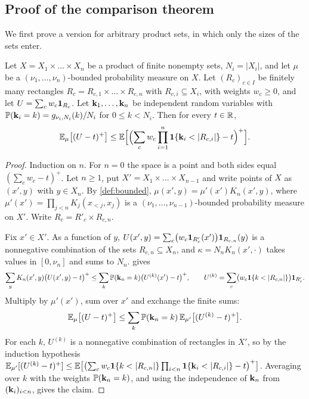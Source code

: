\subsection{Proof of the comparison theorem}\label{sec:proof}

We first prove a version for arbitrary product sets, in which only the sizes of the sets enter.

\begin{proposition}\label{prop:rectangles}
Let $X=X_1\times\dots\times X_n$ be a product of finite nonempty sets, $N_i=|X_i|$, and let $\mu$ be a
$(\nu_1,\dots,\nu_n)$-bounded probability measure on $X$. Let $(R_c)_{c\in I}$ be finitely many rectangles
$R_c=R_{c,1}\times\dots\times R_{c,n}$ with $R_{c,i}\subseteq X_i$, with weights $w_c\ge0$, and let
$U=\sum_cw_c\mathbf{1}_{R_c}$. Let $\mathbf{k}_1,\dots,\mathbf{k}_n$ be independent random variables with
$\mathbb{P}(\mathbf{k}_i=k)=g_{\nu_i,N_i}(k)/N_i$ for $0\le k<N_i$. Then for every $t\in\mathbb{R}$,
\[
  \E_\mu\bigl[(U-t)^+\bigr]\le\E\Bigl[\Bigl(\sum_cw_c\prod_{i=1}^n\one\{\bk_i<|R_{c,i}|\}-t\Bigr)^+\Bigr].
\]
\end{proposition}

\begin{proof}
Induction on $n$. For $n=0$ the space is a point and both sides equal $(\sum_cw_c-t)^+$. Let $n\ge1$, put
$X'=X_1\times\dots\times X_{n-1}$ and write points of $X$ as $(x',y)$ with $y\in X_n$. By
\cref{def:bounded}, $\mu(x',y)=\mu'(x')K_n(x',y)$, where $\mu'(x')=\prod_{j<n}K_j(x_{<j},x_j)$ is a
$(\nu_1,\dots,\nu_{n-1})$-bounded probability measure on $X'$. Write $R_c=R'_c\times R_{c,n}$.

Fix $x'\in X'$. As a function of $y$,
$U(x',y)=\sum_c\bigl(w_c\mathbf{1}_{R'_c}(x')\bigr)\mathbf{1}_{R_{c,n}}(y)$ is a nonnegative combination of the sets
$R_{c,n}\subseteq X_n$, and $\kappa=N_nK_n(x',\cdot)$ takes values in $[0,\nu_n]$ and sums to $N_n$.
 gives
\[
  \sum_yK_n(x',y)\bigl(U(x',y)-t\bigr)^+\le\sum_k\P(\bk_n=k)\bigl(U^{(k)}(x')-t\bigr)^+,\qquad
  U^{(k)}=\sum_c\bigl(w_c\one\{k<|R_{c,n}|\}\bigr)\one_{R'_c}.
\]
Multiply by $\mu'(x')$, sum over $x'$ and exchange the finite sums:
\[
  \mathbb{E}_\mu\bigl[(U-t)^+\bigr]\le\sum_k\mathbb{P}(\mathbf{k}_n=k)\,\mathbb{E}_{\mu'}\bigl[(U^{(k)}-t)^+\bigr].
\]
For each $k$, $U^{(k)}$ is a nonnegative combination of rectangles in $X'$, so by the induction hypothesis
$\E_{\mu'}[(U^{(k)}-t)^+]\le\E\bigl[\bigl(\sum_cw_c\one\{k<|R_{c,n}|\}\prod_{i<n}\one\{\bk_i<|R_{c,i}|\}-t\bigr)^+\bigr]$.
Averaging over $k$ with the weights $\mathbb{P}(\mathbf{k}_n=k)$, and using the independence of $\mathbf{k}_n$ from
$(\mathbf{k}_i)_{i<n}$, gives the claim.
\end{proof}

